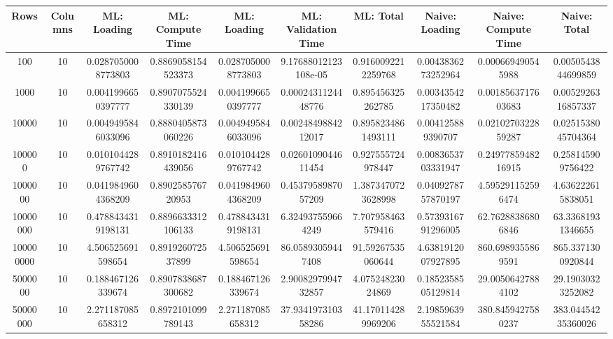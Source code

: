 \begin{table}[htb]
    \centering
    \begin{tabular}{@{}cccccccccc@{}}
        \toprule
        Rows & Columns & ML: Loading & ML: Compute Time & ML: Loading & ML: Validation Time & ML: Total & Naive: Loading & Naive: Compute Time & Naive: Total \\
        \midrule
        100 & 10 & 0.0287050008773803 & 0.8869058154523373 & 0.0287050008773803 & 9.17688012123108e-05 & 0.9160092212259768 & 0.0043836273252964 & 0.000669490545988 & 0.0050543844699859 \\
        1000 & 10 & 0.0041996650397777 & 0.8907075524330139 & 0.0041996650397777 & 0.0002431124448776 & 0.895456325262785 & 0.0034354217350482 & 0.0018563717603683 & 0.0052926316857337 \\
        10000 & 10 & 0.0049495846033096 & 0.8880405873060226 & 0.0049495846033096 & 0.0024849884212017 & 0.8958234861493111 & 0.004125889390707 & 0.0210270322859287 & 0.0251538045704364 \\
        100000 & 10 & 0.0101044289767742 & 0.8910182416439056 & 0.0101044289767742 & 0.0260109044611454 & 0.927555724978447 & 0.0083653703331947 & 0.2497785948216915 & 0.258145909756422 \\
        1000000 & 10 & 0.0419849604368209 & 0.890258576720953 & 0.0419849604368209 & 0.4537958987057209 & 1.3873470723628998 & 0.0409278757870197 & 4.595291152596474 & 4.636222615838051 \\
        10000000 & 10 & 0.4788434319198131 & 0.8896633312106133 & 0.4788434319198131 & 6.324937559664249 & 7.707958463579416 & 0.5739316791296005 & 62.76288386806846 & 63.33681931346655 \\
        100000000 & 10 & 4.506525691598654 & 0.891926072537899 & 4.506525691598654 & 86.05893059447408 & 91.59267535060644 & 4.6381912007927895 & 860.6989355869591 & 865.3371300920844 \\
        5000000 & 10 & 0.188467126339674 & 0.8907838687300682 & 0.188467126339674 & 2.9008297994732857 & 4.07524823024869 & 0.1852358505129814 & 29.00506427884102 & 29.19030323252082 \\
        50000000 & 10 & 2.271187085658312 & 0.8972101099789143 & 2.271187085658312 & 37.934197310358286 & 41.170114289969206 & 2.1985963955521584 & 380.8459427580237 & 383.04454235360026 \\
        \bottomrule
    \end{tabular}
\end{table}